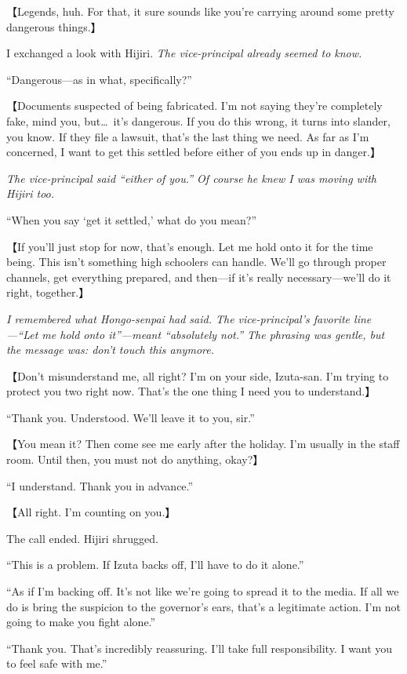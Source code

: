 \documentclass[
    a4paper,
    12pt,
    twoside,
    openany,
    UTF8,
    fontset=windows
]{ctexbook}
\begin{document}
【Legends, huh. For that, it sure sounds like you're carrying around some pretty dangerous things.】

I exchanged a look with Hijiri. \textit{The vice-principal already seemed to know.}

``Dangerous---as in what, specifically?''

【Documents suspected of being fabricated. I'm not saying they're completely fake, mind you, but\dots\ it's dangerous. If you do this wrong, it turns into slander, you know. If they file a lawsuit, that's the last thing we need. As far as I'm concerned, I want to get this settled before either of you ends up in danger.】

\textit{The vice-principal said ``either of you.'' Of course he knew I was moving with Hijiri too.}

``When you say `get it settled,' what do you mean?''

【If you'll just stop for now, that's enough. Let me hold onto it for the time being. This isn't something high schoolers can handle. We'll go through proper channels, get everything prepared, and then---if it's really necessary---we'll do it right, together.】

\textit{I remembered what Hongo-senpai had said. The vice-principal's favorite line---``Let me hold onto it''---meant ``absolutely not.'' The phrasing was gentle, but the message was: don't touch this anymore.}

【Don't misunderstand me, all right? I'm on your side, Izuta-san. I'm trying to protect you two right now. That's the one thing I need you to understand.】

``Thank you. Understood. We'll leave it to you, sir.''

【You mean it? Then come see me early after the holiday. I'm usually in the staff room. Until then, you must not do anything, okay?】

``I understand. Thank you in advance.''

【All right. I'm counting on you.】

The call ended. Hijiri shrugged.

``This is a problem. If Izuta backs off, I'll have to do it alone.''

``As if I'm backing off. It's not like we're going to spread it to the media. If all we do is bring the suspicion to the governor's ears, that's a legitimate action. I'm not going to make you fight alone.''

``Thank you. That's incredibly reassuring. I'll take full responsibility. I want you to feel safe with me.''
\end{document}
